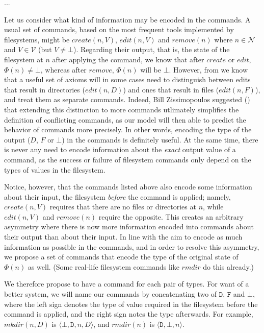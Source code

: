 \documentclass[12pt]{article}
\newcommand{\setv}{\mathcal{V}} %
\newcommand{\setn}{\mathcal{N}} %
\newcommand{\empt}{\bot}
\newcommand{\FS}{\Phi} %
\newcommand{\ccharb}{\empt}
\newcommand{\ccharf}{\mathtt{F}}
\newcommand{\cchard}{\mathtt{D}}
\newcommand{\caaa}[3]{\langle{#1,#2,#3}\rangle}
\newcommand{\caaaa}[4]{\langle{#1,#2,#3,#4}\rangle}
\newcommand{\cbdaa}[2]{\caaaa{\ccharb}{\cchard}{#1}{#2}}
\newcommand{\cdba}[1]{\caaa{\cchard}{\ccharb}{#1}}
\theoremstyle{definition}
\begin{document}
...

Let us consider what kind of information may be encoded in the commands.
A usual set of commands, based on the most frequent tools implemented by filesystems,
might be $create(n,V)$, $edit(n,V)$ and $remove(n)$ where $n\in\setn$ and $V\in\setv$ (but $V\neq\empt$).
Regarding their output, that is, the state of the filesystem at $n$
after applying the command,
we know that after $create$ or $edit$, $\FS(n)\neq\empt$, whereas after $remove$,
$\FS(n)$ will be $\empt$. 
However, from \cite{NREC:alg} we know that a useful set of axioms
will in some cases need to distinguish between edits that result in directories ($edit(n,D)$) and
ones that result in files ($edit(n,F)$), and treat them as separate commands.
Indeed, Bill Zissimopoulos suggested (\cite{BZ}) that extending this distinction to more commands
utlimately simplifies
the definition of conflicting commands, as our model will then able to predict the behavior of commands
more precisely.
In other words, encoding the type of the output ($D$, $F$ or $\empt$) in the commands is definitely useful.
At the same time, there is never any need to encode information about the
\emph{exact} output value of a command,
as the success or failure of filesystem commands only depend on the types of values in the filesystem.

Notice, however, that the commands listed above also encode some information about 
their input, the filesystem
\emph{before} the command is applied; namely, $create(n,V)$ requires that there are no files
or directories at $n$, while $edit(n,V)$ and $remove(n)$ require the opposite.
This creates an arbitrary asymmetry where
there is now more information encoded into commands about their output than about their input.
In line with the aim to encode as much information as possible in the commands, %
and in order to resolve this asymmetry, we propose a set of commands that encode
the type of the original state of $\FS(n)$ as well.
(Some real-life filesystem commands like $rmdir$ do this already.)

We therefore propose to have a command for each pair of types.
For want of a better system, we will name our commands by concatenating
two of $\cchard$, $\ccharf$ and $\ccharb$, 
where the left sign denotes the type of value
required in the filesystem before the command is applied, and the right sign notes the type
afterwards. For example, $mkdir(n,D)$ is $\cbdaa{n}{D}$, and $rmdir(n)$ is $\cdba{n}$.
\end{document}
